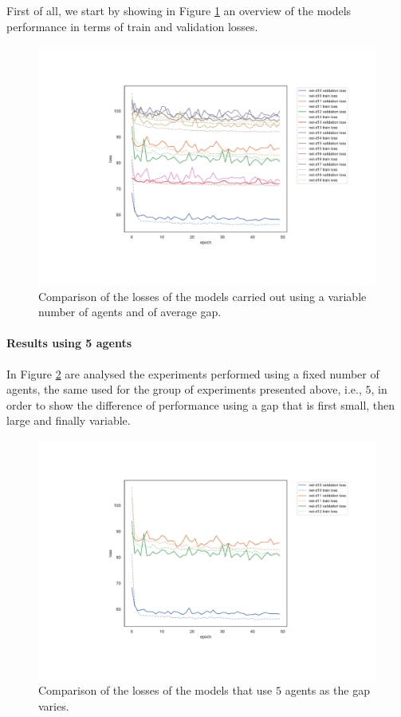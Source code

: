 First of all, we start by showing in Figure \ref{fig:distlossext} an overview of the 
models performance in terms of train and validation losses. 
\begin{figure}[!htb]
	\centering
	\includegraphics[width=.8\textwidth]{contents/images/task1-extension/loss-distributed-all@}%
	\caption[Comparison of losses of the second set of 
	experiments.]{Comparison of the losses of the models carried out using a 
		variable number of agents and of average gap.}
	\label{fig:distlossext}
\end{figure}

\paragraph*{Results using 5 agents}
In Figure \ref{fig:distlossn5} are analysed the experiments performed using a 
fixed number of agents, the same used for the group of experiments presented 
above, i.e., $5$, in order to show the difference of performance using a gap that 
is first small, then large and finally variable.

\begin{figure}[!htb]
	\centering
	\includegraphics[width=.8\textwidth]{contents/images/task1-extension/loss-distributed-N5@}%
	\caption[Comparison of the losses of the models that use $5$ 
	agents.]{Comparison of the losses of the models that use $5$ agents as 
	the gap varies.}
	\label{fig:distlossn5}
\end{figure}

